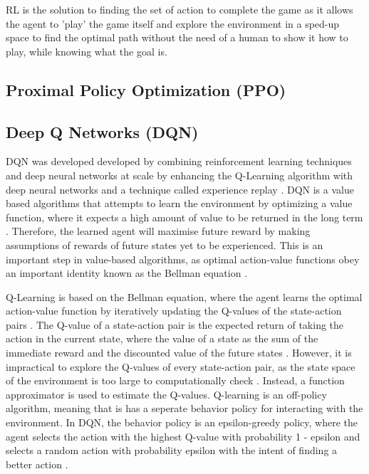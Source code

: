 RL is the solution to finding the set of action to complete the game as it allows the agent to 'play' the game itself and explore the environment in a sped-up space to find the optimal path without the need of a human to show it how to play, while knowing what the goal is. 

\subsection{Proximal Policy Optimization (PPO)}

\subsection{Deep Q Networks (DQN)}

DQN was developed developed by combining reinforcement learning techniques and deep neural networks at scale by enhancing the Q-Learning algorithm with deep neural networks and a technique called experience replay \cite{TFAgentsAuthors2023}. DQN is a value based algorithms that attempts to learn the environment by optimizing a value function, where it expects a high amount of value to be returned in the long term \cite{deepcheckRL}. Therefore, the learned agent will maximise future reward by making assumptions of rewards of future states yet to be experienced. This is an important step in value-based algorithms, as optimal action-value functions obey an important identity known as the Bellman equation \cite{mnih2013playing}. 

Q-Learning is based on the Bellman equation, where the agent learns the optimal action-value function by iteratively updating the Q-values of the state-action pairs \cite{mnih2013playing}. The Q-value of a state-action pair is the expected return of taking the action in the current state, where the value of a state as the sum of the immediate reward and the discounted value of the future states \cite{bellman1958dynamic}.  However, it is impractical to explore the Q-values of every state-action pair, as the state space of the environment is too large to computationally check \cite{mnih2013playing}. Instead, a function approximator is used to estimate the Q-values. Q-learning is an off-policy algorithm, meaning that is has a seperate behavior policy for interacting with the environment. In DQN, the behavior policy is an epsilon-greedy policy, where the agent selects the action with the highest Q-value with probability 1 - epsilon and selects a random action with probability epsilon with the intent of finding a better action \cite{TFAgentsAuthors2023}.

